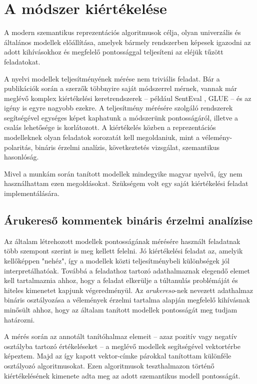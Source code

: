 \chapter{A módszer kiértékelése}
\label{ch:eval}

A modern szemantikus reprezentációs algoritmusok célja, olyan univerzális és általános modellek előállítása, amelyek bármely rendszerben képesek igazodni az adott kihívásokhoz és megfelelő pontossággal teljesíteni az eléjük tűzött feladatokat.

A nyelvi modellek teljesítményének mérése nem triviális feladat. Bár a publikációk során a szerzők többnyire saját módszerrel mérnek, vannak már meglévő komplex kiértékelési keretrendszerek – például SentEval \cite{senteval}, GLUE \cite{glue} – és az igény is egyre nagyobb ezekre. A teljesítmény mérésére szolgáló rendszerek segítségével egységes képet kaphatunk a módszerünk pontosságáról, illetve a csalás lehetősége is korlátozott. A kiértékelés közben a reprezentációs modelleknek olyan feladatok sorozatát kell megoldaniuk, mint a vélemény-polaritás, bináris érzelmi analízis, következtetés vizsgálat, szemantikus hasonlóság.

Mivel a munkám során tanított modellek mindegyike magyar nyelvű, így nem használhattam ezen megoldásokat. Szükségem volt egy saját kiértékelési feladat implementálására.

\section{Árukereső kommentek bináris érzelmi analízise}

Az általam létrehozott modellek pontosságának mérésére használt feladatnak több szempont szerint is meg kellett felelni. Jó kiértékelési feladat az, amelyik kellőképpen "nehéz", így a modellek közti teljesítménybeli különbségek jól interpretálhatóak. Továbbá a feladathoz tartozó adathalmaznak elegendő elemet kell tartalmaznia ahhoz, hogy a feladat elkerülje a túltanulás problémáját és hiteles kimenetet kapjunk végeredményül. Az \textit{arukereso}-nek nevezett adathalmaz bináris osztályozása a vélemények érzelmi tartalma alapján megfelelő kihívásnak minősült ahhoz, hogy az általam tanított modellek pontosságát meg tudjam határozni.

A mérés során az annotált tanítóhalmaz elemeit – azaz pozitív vagy negatív osztályba tartozó értékeléseket – a meglévő modellek segítségével vektortérbe képeztem. Majd az így kapott vektor-címke párokkal tanítottam különféle osztályozó algoritmusokat. Ezen algoritmusok teszthalmazon történő kiértékelésének kimenete adta meg az adott szemantikus modell pontosságát.

